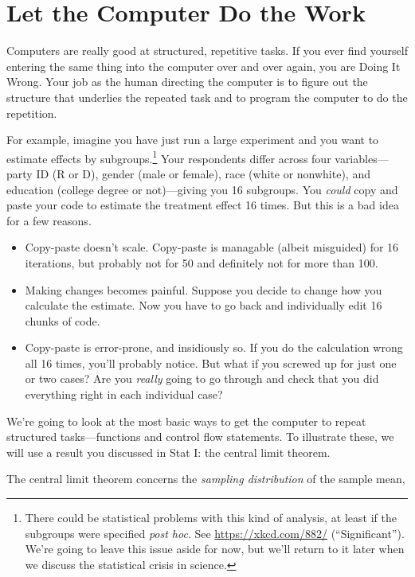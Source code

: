 \documentclass[12pt,oneside,openany]{tufte-book}
\begin{document}
\section{Let the Computer Do the
Work}\label{let-the-computer-do-the-work}

Computers are really good at structured, repetitive tasks. If you ever
find yourself entering the same thing into the computer over and over
again, you are Doing It Wrong. Your job as the human directing the
computer is to figure out the structure that underlies the repeated task
and to program the computer to do the repetition.

For example, imagine you have just run a large experiment and you want
to estimate effects by subgroups.\footnote{There could be statistical
  problems with this kind of analysis, at least if the subgroups were
  specified \emph{post hoc}. See \url{https://xkcd.com/882/}
  (``Significant''). We're going to leave this issue aside for now, but
  we'll return to it later when we discuss the statistical crisis in
  science.} Your respondents differ across four variables---party ID (R
or D), gender (male or female), race (white or nonwhite), and education
(college degree or not)---giving you 16 subgroups. You \emph{could} copy
and paste your code to estimate the treatment effect 16 times. But this
is a bad idea for a few reasons.

\begin{itemize}
\item
  Copy-paste doesn't scale. Copy-paste is managable (albeit misguided)
  for 16 iterations, but probably not for 50 and definitely not for more
  than 100.
\item
  Making changes becomes painful. Suppose you decide to change how you
  calculate the estimate. Now you have to go back and individually edit
  16 chunks of code.
\item
  Copy-paste is error-prone, and insidiously so. If you do the
  calculation wrong all 16 times, you'll probably notice. But what if
  you screwed up for just one or two cases? Are you \emph{really} going
  to go through and check that you did everything right in each
  individual case?
\end{itemize}

We're going to look at the most basic ways to get the computer to repeat
structured tasks---functions and control flow statements. To illustrate
these, we will use a result you discussed in Stat I: the central limit
theorem.

The central limit theorem concerns the \emph{sampling distribution} of
the sample mean,
\end{document}
